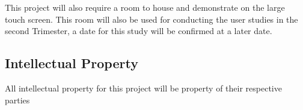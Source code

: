 \documentclass[11pt, a4paper, twoside, openright]{report}
\begin{document}
This project will also require a room to house and demonstrate on the large touch screen. This room will also be used for conducting the user studies in the second Trimester, a date for this study will be confirmed at a later date.

\subsection*{Intellectual Property}

All intellectual property for this project will be property of their respective parties


\nocite{xp2017_aWall, sourceVis2013, SourceVis2010, DBLP:conf/agiledc/GossageBB15, code-space-combining-touch-devices-and-skeletal-tracking-to-support-developer-meetings, craigBook, DBLP:conf/agiledc/GhanamWM08}







\end{document}
